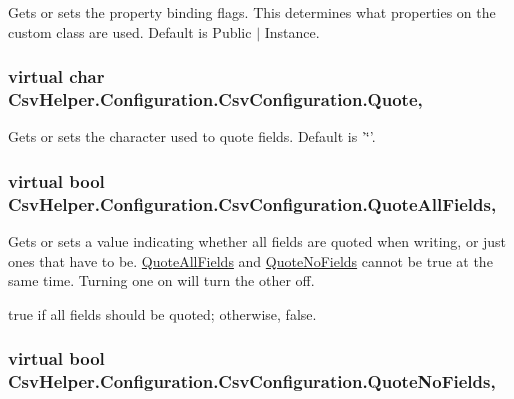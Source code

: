 Gets or sets the property binding flags. This determines what properties on the custom class are used. Default is Public $\vert$ Instance. 

\hypertarget{a00043_a2a8217dbd09f7d7e4c2895893743e25f}{
\subsubsection[{Quote}]{\setlength{\rightskip}{0pt plus 5cm}virtual char Csv\-Helper.\-Configuration.\-Csv\-Configuration.\-Quote\hspace{0.3cm}{\ttfamily [get]}, {\ttfamily [set]}}}\label{a00043_a2a8217dbd09f7d7e4c2895893743e25f}


Gets or sets the character used to quote fields. Default is '\char`\"{}'. 

\hypertarget{a00043_a04022216f3e425eddb2eea8b78425066}{
\subsubsection[{Quote\-All\-Fields}]{\setlength{\rightskip}{0pt plus 5cm}virtual bool Csv\-Helper.\-Configuration.\-Csv\-Configuration.\-Quote\-All\-Fields\hspace{0.3cm}{\ttfamily [get]}, {\ttfamily [set]}}}\label{a00043_a04022216f3e425eddb2eea8b78425066}


Gets or sets a value indicating whether all fields are quoted when writing, or just ones that have to be. \hyperlink{a00043_a04022216f3e425eddb2eea8b78425066}{Quote\-All\-Fields} and \hyperlink{a00043_aa9d54725d696095030d1f4c94825f438}{Quote\-No\-Fields} cannot be true at the same time. Turning one on will turn the other off. 

{\ttfamily true} if all fields should be quoted; otherwise, {\ttfamily false}. \hypertarget{a00043_aa9d54725d696095030d1f4c94825f438}{
\subsubsection[{Quote\-No\-Fields}]{\setlength{\rightskip}{0pt plus 5cm}virtual bool Csv\-Helper.\-Configuration.\-Csv\-Configuration.\-Quote\-No\-Fields\hspace{0.3cm}{\ttfamily [get]}, {\ttfamily [set]}}}\label{a00043_aa9d54725d696095030d1f4c94825f438}


